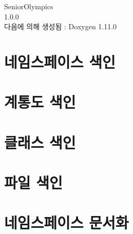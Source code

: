 \documentclass[twoside]{book}
\newcommand{\+}{\discretionary{\mbox{\scriptsize$\hookleftarrow$}}{}{}}
\newcommand{\clearemptydoublepage}{%
    \newpage{\pagestyle{empty}\cleardoublepage}%
  }
\begin{document}
  \raggedbottom
    \hypersetup{pageanchor=false,
                bookmarksnumbered=true,
                pdfencoding=unicode
               }
  \begin{titlepage}
  \vspace*{7cm}
  \begin{center}%
  {\Large Senior\+Olympics}\\
  [1ex]\large 1.\+0.\+0 \\
  \vspace*{1cm}
  {\large 다음에 의해 생성됨 \+:  Doxygen 1.11.0}\\
  \end{center}
  \end{titlepage}
  \clearemptydoublepage
  \tableofcontents
  \clearemptydoublepage
  \hypersetup{pageanchor=true}



\chapter{네임스페이스 색인}

\chapter{계통도 색인}

\chapter{클래스 색인}

\chapter{파일 색인}

\chapter{네임스페이스 문서화}


























\end{document}
